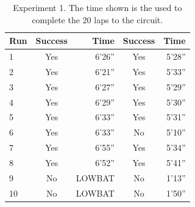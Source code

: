 \begin{table}[H]
	\center
	
	\begin{tabular}{|l|c|r|c|r|}
		\hline
		Run & Success & Time & Success & Time \\
		\hline
		1 	& Yes & 6'26'' & Yes & 5'28'' \\
		2 	& Yes & 6'21'' & Yes & 5'33'' \\
		3 	& Yes & 6'27'' & Yes & 5'29'' \\
		4 	& Yes & 6'29'' & Yes & 5'30'' \\
		5 	& Yes & 6'33'' & Yes & 5'31'' \\
		6 	& Yes & 6'33'' & No  & 5'10'' \\
		7 	& Yes & 6'55'' & Yes & 5'34'' \\
		8 	& Yes & 6'52'' & Yes & 5'41'' \\
		9 	& No & LOWBAT  & No  & 1'13'' \\
		10 	& No & LOWBAT  & No  & 1'50'' \\		
		\hline
	\end{tabular}

	\caption{Experiment 1. The time shown is the used to complete the 20 laps to the circuit.}
	\label{tab:Experiment1}
\end{table}



